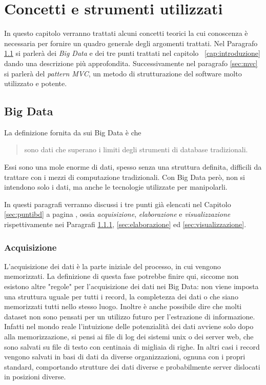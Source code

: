 \chapter{Concetti e strumenti utilizzati}
In questo capitolo verranno trattati alcuni concetti teorici la cui conoscenza è necessaria per fornire un quadro generale degli argomenti trattati. Nel Paragrafo \ref{sec:bigdata} si parlerà dei \emph{Big Data} e dei tre punti trattati nel capitolo~ \ref{cap:introduzione} dando una descrizione più approfondita. Successivamente nel paragrafo \ref{sec:mvc} si parlerà del \emph{pattern MVC}, un metodo di strutturazione del software molto utilizzato e potente.


\section{Big Data}\label{sec:bigdata}
La definizione fornita da \cite{rezzani2013big} sui Big Data è che
\begin{quote}
sono dati che superano i limiti degli strumenti di database tradizionali.
\end{quote} 
Essi sono una mole enorme di dati, spesso senza una struttura definita, difficili da trattare con i mezzi di computazione tradizionali. Con Big Data però, non si intendono solo i dati, ma anche le tecnologie utilizzate per manipolarli.

In questi paragrafi verranno discussi i tre punti già elencati nel Capitolo \ref{sec:puntibd} a pagina \pageref{sec:puntibd}, ossia \emph{acquisizione}, \emph{elaborazione} e \emph{visualizzazione} rispettivamente nei Paragrafi \ref{sec:acquisizione}, \ref{sec:elaborazione} ed \ref{sec:visualizzazione}.


\subsection{Acquisizione}\label{sec:acquisizione}
L'acquisizione dei dati è la parte iniziale del processo, in cui vengono memorizzati. La definizione di questa fase potrebbe finire qui, siccome non esistono altre "regole" per l'acquisizione dei dati nei Big Data: non viene imposta una struttura uguale per tutti i record, la completezza dei dati o che siano memorizzati tutti nello stesso luogo. Inoltre è anche possibile dire che molti dataset non sono pensati per un utilizzo futuro per l'estrazione di informazione. Infatti nel mondo reale l'intuizione delle potenzialità dei dati avviene solo dopo alla memorizzazione, si pensi ai file di log dei sistemi unix o dei server web, che sono salvati su file di testo con centinaia di migliaia di righe. In altri casi i record vengono salvati in basi di dati da diverse organizzazioni, ognuna con i propri standard, comportando strutture dei dati diverse e probabilmente server dislocati in posizioni diverse.

